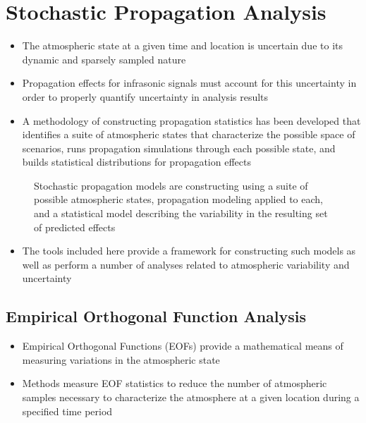 \documentclass[letterpaper,10pt,english]{sphinxmanual}
\let\sphinxpxdimen\pdfpxdimen\else\newdimen\sphinxpxdimen
\begin{document}
\section{Stochastic Propagation Analysis}
\label{\detokenize{analysis:stochastic-propagation-analysis}}\label{\detokenize{analysis:analysis}}\label{\detokenize{analysis::doc}}\begin{itemize}
\item {} 
\sphinxAtStartPar
The atmospheric state at a given time and location is uncertain due to its dynamic and sparsely sampled nature

\item {} 
\sphinxAtStartPar
Propagation effects for infrasonic signals must account for this uncertainty in order to properly quantify uncertainty in analysis results

\item {} 
\sphinxAtStartPar
A methodology of constructing propagation statistics has been developed that identifies a suite of atmospheric states that characterize the possible space of scenarios, runs propagation simulations through each possible state, and builds statistical distributions for propagation effects

\end{itemize}

\begin{figure}[htbp]
\centering
\capstart

\noindent\sphinxincludegraphics[width=500\sphinxpxdimen]{{stochprop_fig1}.jpg}
\caption{Stochastic propagation models are constructing using a suite of possible atmospheric states, propagation modeling applied to each, and a statistical model describing the variability in the resulting set of predicted effects}\label{\detokenize{analysis:id1}}\end{figure}
\begin{itemize}
\item {} 
\sphinxAtStartPar
The tools included here provide a framework for constructing such models as well as perform a number of analyses related to atmospheric variability and uncertainty

\end{itemize}


\subsection{Empirical Orthogonal Function Analysis}
\label{\detokenize{analysis:eofs}}\begin{itemize}
\item {} 
\sphinxAtStartPar
Empirical Orthogonal Functions (EOFs) provide a mathematical means of measuring variations in the atmospheric state

\item {} 
\sphinxAtStartPar
Methods measure EOF statistics to reduce the number of atmospheric samples necessary to characterize the atmosphere at a given location during a specified time period

\end{itemize}
\end{document}
